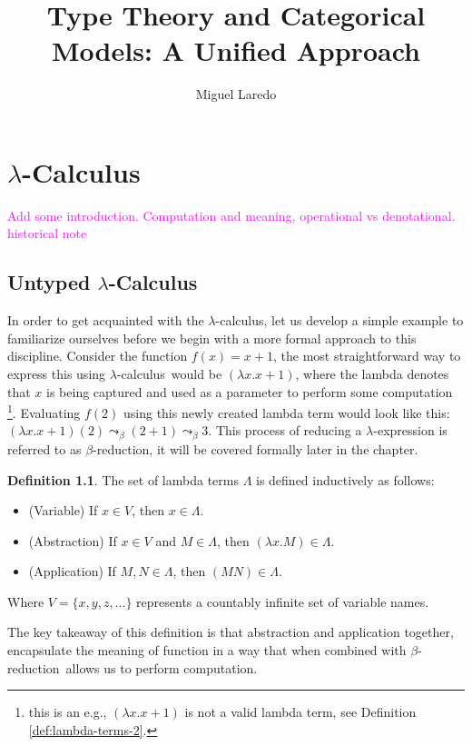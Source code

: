 \documentclass[12pt]{book}
\title{Type Theory and Categorical Models: A Unified Approach}
\author{Miguel Laredo}
\newcommand{\la}{\lambda}
\newcommand{\La}{\Lambda}
\newcommand{\Vset}{V}
\newcommand{\lCalc}{$\la$-Calculus}
\newcommand{\lcalc}{$\la$-calculus}
\newcommand{\bred}{$\beta$-reduction}
\newcommand{\magenta}[1]{\textcolor{magenta}{#1}}
\newcommand{\curly}{\mathrel{\leadsto}_\beta}
\theoremstyle{plain}
\theoremstyle{definition}
\newtheorem{definition}{Definition}[section]
\theoremstyle{definition}
\theoremstyle{definition}
\begin{document}
\chapter{\lCalc}

\magenta{Add some introduction. Computation and meaning, operational vs denotational. historical note}

\section{\centering Untyped \lCalc}
In order to get acquainted with the \lcalc, let us develop a simple example to familiarize ourselves before we begin with a more formal approach to this discipline. Consider the function $f(x) = x + 1$, the most straightforward way to express this using \lcalc \ would be $(\la x . x + 1 )$, where the lambda denotes that $x$ is being captured and used as a parameter to perform some computation \footnote{this is an e.g., $(\la x . x + 1 )$ is not a valid lambda term, see Definition \ref{def:lambda-terms-2}.}. Evaluating $f(2)$ using this newly created lambda term would look like this: $(\la x . x + 1)(2) \curly (2 + 1) \curly 3$. This process of reducing a $\la$-expression is referred to as \bred, it will be covered formally later in the chapter.
\begin{definition} The set of lambda terms \( \La \) is defined inductively as follows:
  \label{def:lambda-terms-1}
  \begin{itemize}
  \item (Variable) If \( x \in \Vset \), then \( x \in \La \).  
  \item (Abstraction) If \( x \in \Vset \) and \( M \in \La \), then \( (\la x. M) \in \La \).
  \item (Application) If \( M, N \in \La \), then \((M N) \in \La \).
  \end{itemize}
  Where $\Vset = \{x, y, z, ... \}$ represents a countably infinite set of variable names.
\end{definition}
The key takeaway of this definition is that abstraction and application together, encapsulate the meaning of function in a way that when combined with \bred \ allows us to perform computation.
\end{document}

